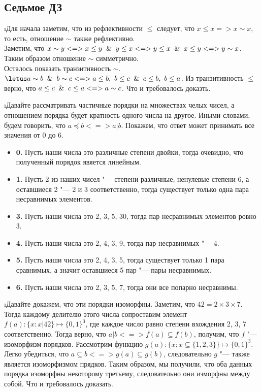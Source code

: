 \subsection{Седьмое ДЗ}


\i Для начала заметим, что из рефлективности $\leq$ следует, что $x \leq x => x \sim x$, то есть, отношение $\sim$ также рефлективно.\\
Заметим, что $x \sim y <=> x \leq y \And y \leq x <=> y \leq x \And x \leq y <=> y \sim x$. Таким образом отношение $\sim$ симметрично.\\
Осталось показать транзитивность $\sim$. $\letus a \sim b \And b \sim c <=> a \leq b,\  b \leq c \And c \leq b,\  b \leq a$. Из транзитивность $\leq$ верно, что $a \leq c \And c \leq a <=> a \sim c$. Что и требовалось доказть.

\i Давайте рассматривать частичные порядки на множествах челых чисел, а отношением порядка будет кратность одного числа на другое. Иными словами, будем говорить, что $a \preccurlyeq b <=> a | b$.
Покажем, что ответ может принимать все значения от 0 до 6.
\begin{itemize}
    \item \textbf{0.} Пусть наши числа это различные степени двойки, тогда очевидно, что полученный порядок явяется линейным.
    \item \textbf{1.} Пусть 2 из наших чисел "--- степени различные, ненулевые степени 6, а оставшиеся 2 "--- 2 и 3 соответственно, тогда существует только одна пара несравнимых элементов.
    \item \textbf{3.} Пусть наши числа это 2, 3, 5, 30, тогда пар несравнимых элементов ровно 3.
    \item \textbf{4.} Пусть наши числа это 2, 4, 3, 9, тогда пар несравнимых "--- 4.
    \item \textbf{5.} Пусть наши числа это 2, 4, 3, 5, тогда существует только 1 пара сравнимых, а значит оставшиеся 5 пар "--- пары несравнимых.
    \item \textbf{6.} Пусть наши числа это 2, 3, 5, 7, тогда они все попарно несравнимы.
\end{itemize}

\i Давайте докажем, что эти порядки изоморфны. Заметим, что $42 = 2 \times 3 \times 7$. Тогда каждому делителю этого числа сопроставим элемент $f(a): \{x: x|42\} \mapsto \{0, 1\}^3$, где каждое число равно степени вхождения 2, 3, 7 соответственно. Тогда верно, что $a | b <=> f(a) \subseteq f(b)$, получим, что $f$ "--- изоморфизм порядков. Рассмотрим функцию $g(a): \{x: x\subseteq \{1, 2, 3\}\} \mapsto \{0, 1\}^3$. Легко убедиться, что $a \subseteq b <=> g(a) \subseteq g(b)$, следовательно $g$ "--- также является изоморфизмом прядков. Таким образом, мы получили, что оба данных порядка изоморфны некоторому третьему, следовательно они изморфны между собой. Что и требовалось доказать.

